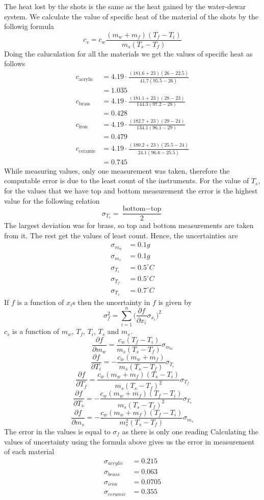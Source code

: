 \documentclass[12pt]{article}
\begin{document}
The heat lost by the shots is the same as the heat gained by the water-dewar system.
We calculate the value of specific heat of the material of the shots by the followig formula
\[c_s=c_w\frac{(m_w+m_f)(T_f-T_i)}{m_s(T_s-T_f)}\]
Doing the caluculation for all the materials we get the values of specific heat as follows
\begin{align*}
    c_{\text{acrylic}} &= 4.19\cdot \frac{(181.6+23)(26-22.5)}{41.7(95.5-26)} \\
    &=1.035\\
    c_{\text{brass}} &= 4.19\cdot \frac{(181.1+23)(28-23)}{144.3(97.2-28)} \\
    &=0.428 \\
    c_{\text{iron}} &= 4.19\cdot \frac{(182.7+23)(29-24)}{134.1(96.1-29)} \\
    &=0.479\\
    c_{\text{ceramic}} &= 4.19\cdot \frac{(180.2+23)(25.5-24)}{24.1(96.6-25.5)} \\
    &=0.745
\end{align*}
While measuring values, only one measurement was taken, therefore the computable error is due to the least count of the instruments.
For the value of $T_s$, for the values that we have top and bottom measurement the error is the highest value for the following relation $$\sigma_{T_s} = \frac{\text{bottom}-\text{top}}{2}$$
The largest deviation was for brass, so top and bottom measurements are taken from it.
The rest get the values of least count.
Hence, the uncertainties are
\begin{align*}
    \sigma_{m_w} &= 0.1g \\
    \sigma_{m_s} &= 0.1g \\
    \sigma_{T_i} &= 0.5^\circ C \\
    \sigma_{T_f} &= 0.5^\circ C \\
    \sigma_{T_s} &= 0.7^\circ C
\end{align*}
If $f$ is a function of $x_i$s then the uncertainty in $f$ is given by
\[\sigma_f^2=\sum_{i = 1}^{n} \bigg(\frac{\partial f}{\partial x_i}\sigma_{x_i}\bigg)^2 \]
$c_s$ is a function of $m_w$, $T_f$, $T_i$, $T_s$ and $m_s$.
\[\frac{\partial f}{\partial {m_w}}=\frac{c_w(T_f-T_i)}{m_s(T_s-T_f)}\sigma_{m_w}\]
\[\frac{\partial f}{\partial {T_i}}=-\frac{c_w(m_w+m_f)}{m_s(T_s-T_f)}\sigma_{T_i}\]
\[\frac{\partial f}{\partial {T_f}}=\frac{c_w(m_w+m_f)(T_s-T_i)}{m_s(T_s-T_f)^2}\sigma_{T_f}\]
\[\frac{\partial f}{\partial {T_s}}=-\frac{c_w(m_w+m_f)(T_f-T_i)}{m_s(T_s-T_f)^2}\sigma_{T_s}\]
\[\frac{\partial f}{\partial {m_s}}=-\frac{c_w(m_w+m_f)(T_f-T_i)}{m_s^2(T_s-T_f)}\sigma_{m_s}\]
The error in the values is equal to $\sigma_f$ as there is only one reading
Calculating the values of uncertainty using the formula above gives us the error in measurement of each material
\begin{align*}
    \sigma_{acrylic} &= 0.215 \\
    \sigma_{brass} &= 0.063 \\
    \sigma_{iron} &= 0.0705 \\
    \sigma_{ceramic} &= 0.355
\end{align*}
\end{document}
